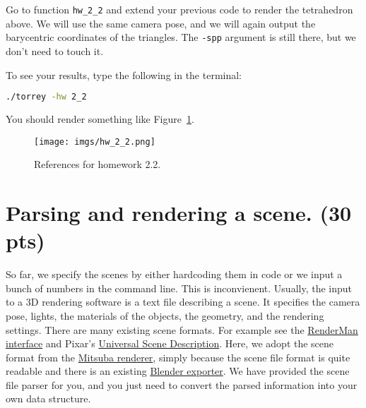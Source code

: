 Go to function \lstinline{hw_2_2} and extend your previous code to render the tetrahedron above. We will use the same camera pose, and we will again output the barycentric coordinates of the triangles. The \lstinline{-spp} argument is still there, but we don't need to touch it.

To see your results, type the following in the terminal:
\begin{lstlisting}[language=bash]
  ./torrey -hw 2_2
\end{lstlisting}

You should render something like Figure~\ref{fig:hw_2_2}.

\begin{figure}[ht]
    \centering
    \texttt{[image: imgs/hw\_2\_2.png]}
    \caption{References for homework 2.2.}
    \label{fig:hw_2_2}
\end{figure}

\section{Parsing and rendering a scene. (30 pts)}
So far, we specify the scenes by either hardcoding them in code or we input a bunch of numbers in the command line. 
This is inconvienent. Usually, the input to a 3D rendering software is a text file describing a scene. It specifies the camera pose, lights, the materials of the objects, the geometry, and the rendering settings. There are many existing scene formats. For example see the \href{https://en.wikipedia.org/wiki/RenderMan_Interface_Specification}{RenderMan interface} and Pixar's \href{https://en.wikipedia.org/wiki/Universal_Scene_Description}{Universal Scene Description}. Here, we adopt the scene format from the \href{https://mitsuba.readthedocs.io/}{Mitsuba renderer}, simply because the scene file format is quite readable and there is an existing \href{https://github.com/mitsuba-renderer/mitsuba-blender}{Blender exporter}. We have provided the scene file parser for you, and you just need to convert the parsed information into your own data structure.

